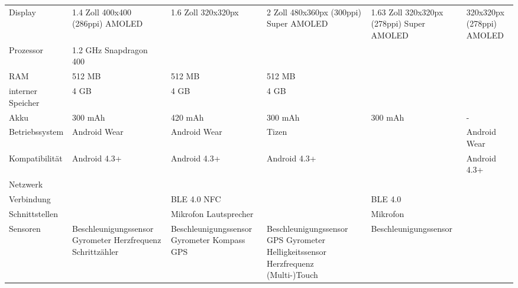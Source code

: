 \begin{landscape}
\begin{longtable}{p{2.8cm}p{3.5cm}p{3.5cm}p{3.5cm}p{3.5cm}p{3.5cm}}
	Display
		& 1.4 Zoll \newline
			400x400 (286ppi) \newline
			AMOLED
		& 1.6 Zoll \newline
			320x320px
		& 2 Zoll \newline
			480x360px (300ppi) \newline
			Super AMOLED
		& 1.63 Zoll \newline
			320x320px (278ppi) \newline
			Super AMOLED
		& \newline
			320x320px (278ppi) \newline
			AMOLED \\
	Prozessor
		& 1.2 GHz \newline
			Snapdragon 400 \\
	RAM
		& 512 MB
		& 512 MB
		& 512 MB
		&
		&\\
	interner Speicher
		& 4 GB
		& 4 GB
		& 4 GB
		&
		&\\
	Akku
		& 300 mAh
		& 420 mAh 
		& 300 mAh
		& 300 mAh
		& -\\
	Betriebssystem
		& Android Wear
		& Android Wear
		& Tizen 
		&
		& Android Wear \\
	Kompatibilität
		& Android 4.3+
		& Android 4.3+
		& Android 4.3+
		&
		& Android 4.3+ \\
	Netzwerk
		&
		&
		& 
		&
		& \\
	Verbindung
		&
		& BLE 4.0 \newline
			NFC
		&
		& BLE 4.0
		& \\
	Schnittstellen
		&
		& Mikrofon \newline
			Lautsprecher
		&
		& Mikrofon \\
	Sensoren
		& Beschleunigungssensor \newline
			Gyrometer \newline
			Herzfrequenz \newline
			Schrittzähler
		& Beschleunigungssensor \newline
			Gyrometer \newline
			Kompass \newline
			GPS
		& Beschleunigungssensor \newline
			GPS \newline
			Gyrometer \newline
			Helligkeitssensor\newline			
			Herzfrequenz \newline
			(Multi-)Touch
		& Beschleunigungssensor \newline

\end{longtable}
\end{landscape}

